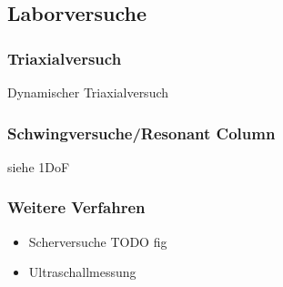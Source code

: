 \subsection{Laborversuche}


\begin{frame}
\frametitle{Triaxialversuch}

Dynamischer Triaxialversuch
\end{frame}


\begin{frame}
\frametitle{Schwingversuche/Resonant Column}

siehe 1DoF
\end{frame}


\begin{frame}
\frametitle{Weitere Verfahren}
\begin{itemize}
 \item Scherversuche 
       TODO fig
 
 \item Ultraschallmessung
\end{itemize}



\end{frame}
